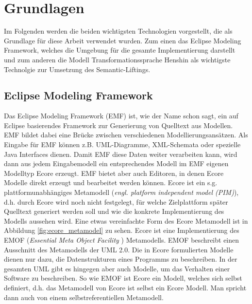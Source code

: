 \chapter{Grundlagen}
\label{grundlagen}

Im Folgenden werden die beiden wichtigsten Technologien vorgestellt, die als Grundlage für diese
Arbeit verwendet wurden. Zum einen das Eclipse Modeling Framework, welches die Umgebung für die
gesamte Implementierung darstellt und zum anderen die Modell Transformationssprache Henshin als
wichtigste Technolgie zur Umsetzung des Semantic-Liftings.

\section{Eclipse Modeling Framework}

Das Eclipse Modeling Framework (EMF) ist, wie der Name schon sagt, ein auf Eclipse basierendes
Framework zur Generierung von Quelltext aus Modellen. EMF bildet dabei eine Brücke zwischen
verschiedenen Modellierungsansätzen. Als Eingabe für EMF können z.B. UML-Diagramme, XML-Schemata
oder spezielle Java Interfaces dienen. Damit EMF diese Daten weiter verarbeiten kann, wird dann aus
jedem Eingabemodell ein entsprechendes Modell im EMF eigenen Modelltyp Ecore erzeugt. EMF bietet
aber auch Editoren, in denen Ecore Modelle direkt erzeugt und bearbeitet werden können. Ecore ist
ein s.g. plattformunabhängiges  Metamodell (\textit {engl. platform independent model (PIM)}), d.h.
durch Ecore wird noch nicht festgelegt, für welche Zielplattform später Quelltext generiert werden
soll und wie die konkrete Implementierung des Modells aussehen wird. Eine etwas vereinfachte Form
des Ecore Metamodell ist in Abbildung \ref{fig:ecore_metamodel} zu sehen. Ecore ist eine Implementierung
des EMOF (\textit{Essential Meta Object Facility} \cite{MOF}) Metamodells. EMOF beschreibt einen
Ausschnitt des Metamodells der UML 2.0. Die in Ecore formulierten Modelle dienen nur dazu, die
Datenstrukturen eines Programms zu beschreiben. In der gesamten UML gibt es hingegen aber auch
Modelle, um das Verhalten einer Software zu beschreiben. So wie EMOF ist Ecore ein Modell, welches
sich selbst definiert, d.h. das Metamodell von Ecore ist selbst ein Ecore Modell. Man spricht dann
auch von einem selbstreferentiellen Metamodell.

